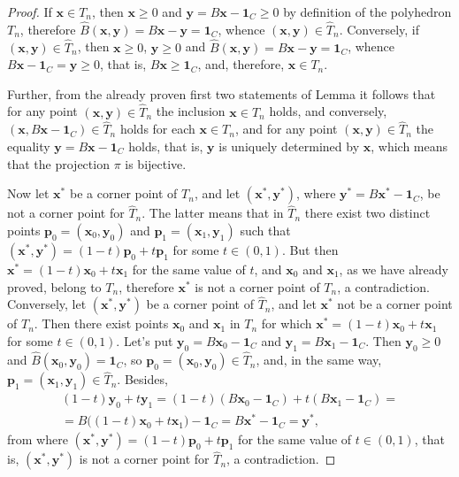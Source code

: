 \documentclass[10pt,a4paper]{amsart}
\def\bp{\boldsymbol{p}}
\def\bx{\boldsymbol{x}}
\def\by{\boldsymbol{y}}
\def\hB{{\widehat{B}}}
\def\hT{{\widehat{T}}}
\def\one{\mathbf{1}}
\begin{document}
\begin{proof}
If $\bx\in T_n$, then $\bx\ge0$ and $\by=B\bx -\one_C\ge0$ by definition of the polyhedron $T_n$, therefore $\hB(\bx,\by)=B\bx-\by=\one_C$, whence $(\bx,\by)\in\hT_n$. Conversely, if $(\bx,\by)\in\hT_n$, then $\bx\ge0$, $\by\ge0$ and $\hB(\bx,\by)=B\bx-\by=\one_C$, whence $B\bx-\one_C=\by\ge0$, that is, $B\bx\ge\one_C$, and, therefore, $\bx\in T_n$.

Further, from the already proven first two statements of Lemma it follows that for any point $(\bx,\by)\in\hT_n$ the inclusion $\bx\in T_n$ holds, and conversely, $(\bx,B\bx-\one_C)\in\hT_n$ holds for each $\bx\in T_n$, and for any point $(\bx,\by)\in\hT_n$ the equality $\by=B\bx-\one_C$ holds, that is, $\by$ is uniquely determined by $\bx$, which means that the projection $\pi$ is bijective.

Now let $\bx^*$ be a corner point of $T_n$, and let $(\bx^*,\by^*)$, where $\by^*=B\bx^*-\one_C$, be not a corner point for $\hT_n$. The latter means that in $\hT_n$ there exist two distinct points $\bp_0=(\bx_0,\by_0)$ and $\bp_1=(\bx_1,\by_1)$ such that $(\bx^*,\by^*)=(1-t)\bp_0+t\bp_1$ for some $t\in(0,1)$. But then $\bx^*=(1-t)\bx_0+t\bx_1$ for the same value of $t$, and $\bx_0$ and $\bx_1$, as we have already proved, belong to $T_n$, therefore $\bx^*$ is not a corner point of $T_n$, a contradiction. Conversely, let $(\bx^*,\by^*)$ be a corner point of $\hT_n$, and let $\bx^*$ not be a corner point of $T_n$. Then there exist points $\bx_0$ and $\bx_1$ in $T_n$ for which $\bx^*=(1-t)\bx_0+t\bx_1$ for some $t\in(0,1)$. Let's put $\by_0=B\bx_0-\one_C$ and $\by_1=B\bx_1-\one_C$. Then $\by_0\ge0$ and $\hB(\bx_0,\by_0)=\one_C$, so $\bp_0=(\bx_0,\by_0)\in\hT_n$, and, in the same way, $\bp_1=(\bx_1,\by_1)\in\hT_n$. Besides,
\begin{multline*}
(1-t)\by_0+t\by_1=(1-t)(B\bx_0-\one_C)+t(B\bx_1-\one_C)=\\
=B\big((1-t)\bx_0+t\bx_1\big)-\one_C=B\bx^*-\one_C=\by^*,
\end{multline*}
from where $(\bx^*,\by^*)=(1-t)\bp_0+t\bp_1$ for the same value of $t\in(0,1)$, that is, $(\bx^*,\by^*)$ is not a corner point for $\hT_n$, a contradiction.
\end{proof}
\end{document}
